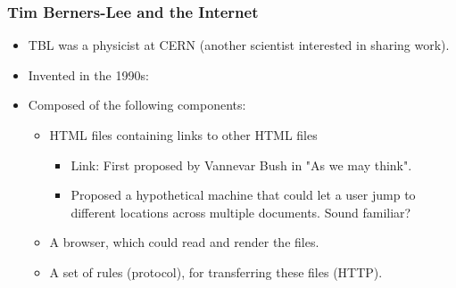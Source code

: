 \documentclass{beamer}
\begin{document}
%
%
\begin{frame}[fragile]
    \frametitle{Tim Berners-Lee and the Internet}
    \begin{itemize}
        \item TBL was a physicist at CERN (another scientist interested in sharing work).
        \item Invented in the 1990s:
        \item Composed of the following components:
            \begin{itemize}
                \pause
                \item HTML files containing links to other HTML files
                    \pause
                    \begin{itemize}
                        \item Link: First proposed by Vannevar Bush in "As we may think".
                        \item Proposed a hypothetical machine that could let a user jump to different locations across multiple documents. Sound familiar?
                    \end{itemize}
                \item A browser, which could read and render the files.
                    \pause
                \item A set of rules (protocol), for transferring these files (HTTP).
            \end{itemize}

    \end{itemize}
\end{frame}
\end{document}
